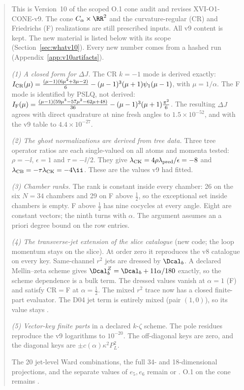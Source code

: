 \begin{abstract}
This is Version~10 of the scoped O.1 cone audit and revises
XVI-O1-CONE-v9. The cone \(C_\alpha\times\RR^2\) and the
curvature-regular (CR) and Friedrichs (F) realizations are still
prescribed inputs. All v9 content is kept. The new material is
listed below with its scope (Section~\ref{sec:whatv10}). Every new
number comes from a hashed run (Appendix~\ref{app:v10artifacts}).

\emph{(1) A closed form for \(\Delta J\).} The CR \(k=-1\) mode is
derived exactly:
\(I_{\rm CR}(\mu)=\tfrac{(\mu-1)(6\mu^2+3\mu-2)}6-(\mu-1)^3(\mu+1)\psi_1(\mu-1)\),
with \(\mu=1/\alpha\). The F mode is identified by PSLQ, not derived:
\(I_{\rm F}(\mu)=\tfrac{(\mu-1)(59\mu^3-57\mu^2-62\mu+48)}{36}-(\mu-1)^3(\mu+1)\tfrac{\pi^2}6\).
The resulting \(\Delta J\) agrees with direct quadrature at nine
fresh angles to \(1.5\times10^{-52}\), and with the v9 table to
\(4.4\times10^{-27}\).

\emph{(2) The ghost normalizations are derived from tree data.}
Three tree operator ratios are each single-valued on all atoms and
momenta tested: \(\rho=-\ii\), \(\epsilon=1\) and \(\tau=-\ii/2\).
They give \(\lambda_{\rm CK}=4\rho\lambda_{\rm pred}/\epsilon=-8\)
and \(\lambda_{\rm CB}=-\tau\lambda_{\rm CK}=-4\ii\). These are the
values v9 had fitted.

\emph{(3) Chamber ranks.} The rank is constant inside every
chamber: 26 on the six \(N=34\) chambers and 29 on F above
\(\tfrac12\), so the exceptional set inside chambers is empty. F
above \(\tfrac12\) has nine cocycles at every angle. Eight are
constant vectors; the ninth turns with \(\alpha\). The argument
assumes an a priori degree bound on the row entries.

\emph{(4) The transverse-jet extension of the slice catalogue}
(new code; the loop momentum stays on the slice). At order zero it
reproduces the v8 catalogue on every key. Same-channel \(r^2\) jets
are dressed by \(\Dcal_b\). A declared Mellin--zeta scheme gives
\(\Dcal^Z_b=\Dcal_b+11\alpha/180\) exactly, so the scheme dependence
is a bulk term. The dressed values vanish at \(\alpha=1\) (F) and
satisfy CR\(=\)F at \(\alpha=\tfrac12\). The mixed \(r^2\) trace
now has a closed finite-part evaluator. The D04 jet term is
entirely mixed (pair \((1,0)\)), so its value stays \PARTIAL.

\emph{(5) Vector-key finite parts} in a declared \(k\)-\(\zeta\)
scheme. The pole residues reproduce the v9 logarithms to
\(10^{-20}\). The off-diagonal keys are zero, and the diagonal keys
are \(\pm c(\alpha)\kappa^2P_L^2\).

The 20 jet-level Ward combinations, the full 34- and 18-dimensional
projections, and the separate values of \(e_5,e_6\) remain \OPEN{}
or \PARTIAL. O.1 on the cone remains \NOTCLOSED.
\end{abstract}
